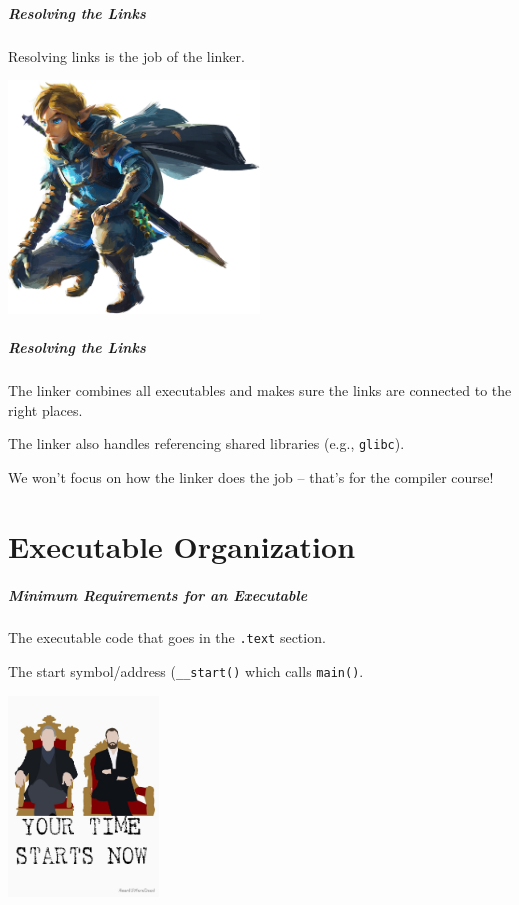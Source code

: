 \begin{frame}
\frametitle{Resolving the Links}

Resolving links is the job of the \alert{linker}.

\begin{center}
  \includegraphics[width=0.5\textwidth]{images/link.png}
\end{center}

\end{frame}

\begin{frame}
\frametitle{Resolving the Links}
The linker combines all executables and makes sure the links are connected to the right places.

The linker also handles referencing shared libraries (e.g., \texttt{glibc}).

We won't focus on how the linker does the job -- that's for the compiler course!

\end{frame}

\part{Executable Organization}

\begin{frame}
\partpage
\end{frame}


\begin{frame}
\frametitle{Minimum Requirements for an Executable}

The executable code that goes in the \texttt{.text} section.

The start symbol/address (\texttt{\_\_start()} which calls \texttt{main()}.

\begin{center}
  \includegraphics[width=0.3\textwidth]{images/taskmaster.jpg}
\end{center}

\end{frame}


